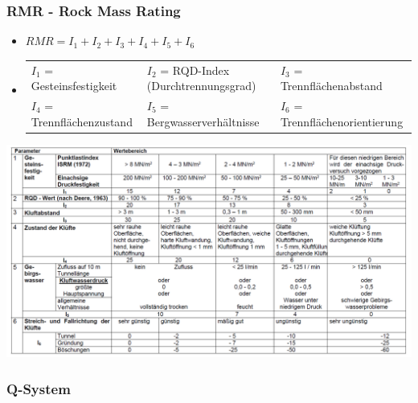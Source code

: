 \documentclass[fleqn,twoside]{article}
\begin{document}
\subsubsection{RMR - Rock Mass Rating}
\begin{itemize}
    \item $RMR = I_1 + I_2 + I_3 + I_4 + I_5 + I_6$
    \item 
    \begin{tabular}{l l l}
            $I_1$ = Gesteinsfestigkeit & $I_2$ = RQD-Index (Durchtrennungsgrad) & $I_3$ = Trennflächenabstand\\ 
            $I_4$ = Trennflächenzustand & $I_5$ = Bergwasserverhältnisse & $I_6$ = Trennflächenorientierung
    \end{tabular}
\end{itemize}
\includegraphics[width=1\textwidth]{Grafiken/RMR_Tabelle.png}

\subsubsection{Q-System}\label{Q}
\end{document}

